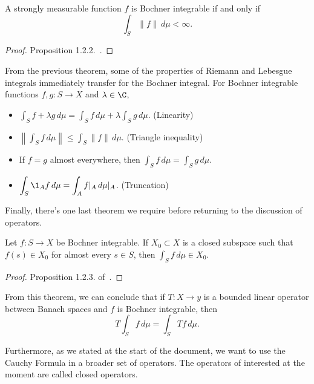 \begin{theorem}\label{thm:bochner_integral_equivalent_definition}
    A strongly measurable function $f$ is Bochner integrable if and only if
    \[ \int_S \|f\|\, d\mu < \infty. \]
\end{theorem}
\begin{proof}
    Proposition 1.2.2.~\cite{hytönen2016analysis}.
\end{proof}

\begin{remark} From the previous theorem, some of the properties of Riemann and Lebesgue integrals immediately transfer for the Bochner integral. For Bochner integrable functions $f,g: S \to X$ and $\lambda \in \C$,
    \begin{itemize}
        \item $\displaystyle \int_S f+\lambda g \, d\mu =\int_S f \, d\mu + \lambda \int_S  g \, d\mu $. (Linearity)
        \item $\displaystyle \left\| \int_S f \, d\mu \right\| \leq \int_S \|f\| \, d\mu $. (Triangle inequality)
        \item If $f = g$ almost everywhere, then $\displaystyle \int_S f\, d\mu = \int_S  g \, d\mu $.
        \item $\displaystyle \int_S \1_A f\, d\mu = \int_A f|_A\, d\mu|_A$. (Truncation)
    \end{itemize}
    Finally, there's one last theorem we require before returning to the discussion of operators.
\end{remark}

\begin{theorem}\label{th:closed_bochner_integral_limit}
    Let $f: S \to X$ be Bochner integrable. If $X_0 \subset X$ is a closed subspace such that $f(s) \in X_0$ for almost every $s \in S$, then $\int_S f\, d\mu \in X_0$.
\end{theorem}
\begin{proof}
    Proposition 1.2.3. of~\cite{hytönen2016analysis}.
\end{proof}

From this theorem, we can conclude that if $T: X \to y$ is a bounded linear operator between Banach spaces and $f$ is Bochner integrable, then
\[ T \int_S f\, d\mu = \int_S Tf \, d\mu.\]

Furthermore, as we stated at the start of the document, we want to use the Cauchy Formula in a broader set of operators. The operators of interested at the moment are called closed operators.

